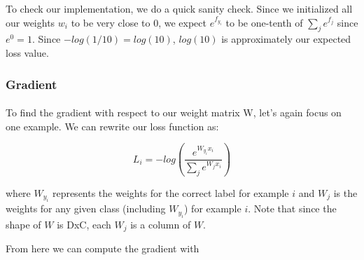 \documentclass[12pt]{article}
\begin{document}
To check our implementation, we do a quick sanity check. 
Since we initialized all our weights $w_{i}$ to be very close to 0, we
expect $e^{f_{y_{i}}}$ to be one-tenth of $\sum_{j} e^{f_{j}}$ since 
$e^{0} = 1$. Since $-log(1/10) = log(10)$, $log(10)$ is approximately our 
expected loss value. 

\subsubsection{Gradient}
\paragraph{}
To find the gradient with respect to our weight 
matrix W, let's again focus on one example. We can rewrite our loss function as:

\begin{equation}
    L_{i} = -log(\frac{e^{W_{y_{i}}x_{i}}}{\sum_{j} e^{W_{j}x_{i}}}) 
\end{equation}

where $W_{y_{i}}$ represents the weights for the correct label for example $i$ and $W_{j}$ 
is the weights for any given class (including $W_{y_{i}}$) for example $i$. Note that since the shape 
of $W$ is DxC, each $W_{j}$ is a column of $W$. 

From here we can compute the gradient with 
\end{document}

